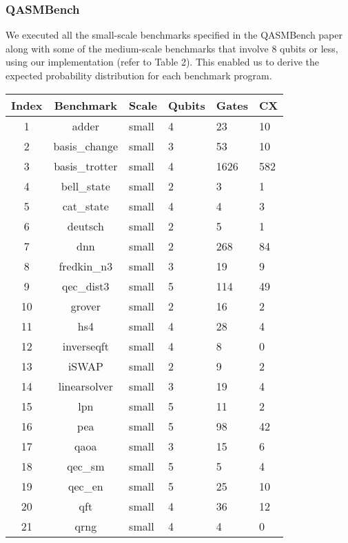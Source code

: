 \documentclass[10pt,a4paper]{article}
\newcommand{\<}{\langle}
\renewcommand{\>}{\rangle}
\begin{document}
\subsubsection{QASMBench}

We executed all the small-scale benchmarks specified in the QASMBench paper along with some of the
medium-scale benchmarks that involve 8 qubits or less, using our implementation (refer to Table 2).
This enabled us to derive the expected probability distribution for each benchmark program.

\begin{table}[h]
\centering
\begin{tabularx}{\textwidth}{|c|c|X|X|X|X|}
\hline
\textbf{Index} & \textbf{Benchmark} & \textbf{Scale} & \textbf{Qubits} & \textbf{Gates} & \textbf{CX} \\
\hline
1 & adder & small & 4 & 23 & 10 \\
\hline
2 & basis\_change & small & 3 & 53 & 10 \\
\hline
3 & basis\_trotter & small & 4 & 1626 & 582 \\
\hline
4 & bell\_state & small & 2 & 3 & 1 \\
\hline
5 & cat\_state & small & 4 & 4 & 3 \\
\hline
6 & deutsch & small & 2 & 5 & 1 \\
\hline
7 & dnn & small & 2 & 268 & 84 \\
\hline
8 & fredkin\_n3 & small & 3 & 19 & 9 \\
\hline
9 & qec\_dist3 & small & 5 & 114 & 49 \\
\hline
10 & grover & small & 2 & 16 & 2 \\
\hline
11 & hs4 & small & 4 & 28 & 4 \\
\hline
12 & inverseqft & small & 4 & 8 & 0 \\
\hline
13 & iSWAP & small & 2 & 9 & 2 \\
\hline
14 & linearsolver & small & 3 & 19 & 4 \\
\hline
15 & lpn & small & 5 & 11 & 2 \\
\hline
16 & pea & small & 5 & 98 & 42 \\
\hline
17 & qaoa & small & 3 & 15 & 6 \\
\hline
18 & qec\_sm & small & 5 & 5 & 4 \\
\hline
19 & qec\_en & small & 5 & 25 & 10 \\
\hline
20 & qft & small & 4 & 36 & 12 \\
\hline
21 & qrng & small & 4 & 4 & 0 \\

\end{tabularx}
\end{table}
\end{document}
